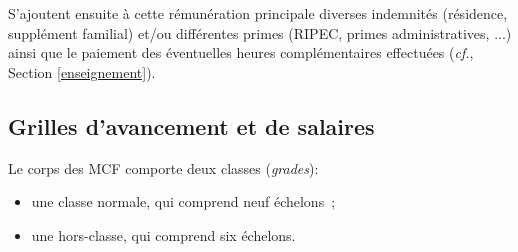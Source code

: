 S'ajoutent ensuite \`a cette r\'emun\'eration principale diverses indemnit\'es
(r\'esidence, suppl\'ement familial)
et/ou diff\'erentes primes (RIPEC, primes administratives, ...)
ainsi que le paiement des \'eventuelles heures compl\'emen\-taires effectu\'ees
({\em cf.}, Section \ref{enseignement}).


\subsection{Grilles d'avancement et de salaires}\label{sec. grilles}

Le corps des MCF comporte deux classes
(\textit{grades}):
\begin{itemize}
\item une classe normale, qui comprend neuf \'echelons~;
\item une hors-classe, qui comprend six \'echelons.
\end{itemize}

